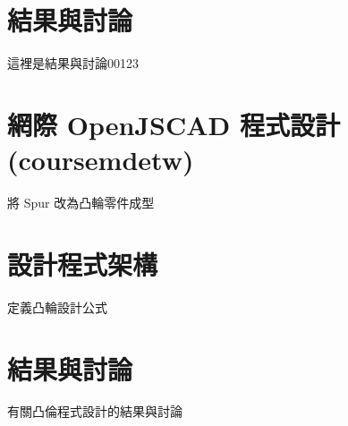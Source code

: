 \documentclass[]{article}
\begin{document}
\section{結果與討論}\label{ux7d50ux679cux8207ux8a0eux8ad6-14}

這裡是結果與討論00123

\section{網際 OpenJSCAD
程式設計(coursemdetw)}\label{ux7db2ux969b-openjscad-ux7a0bux5f0fux8a2dux8a08coursemdetw}

將 Spur 改為凸輪零件成型

\section{設計程式架構}\label{ux8a2dux8a08ux7a0bux5f0fux67b6ux69cb}

定義凸輪設計公式

\section{結果與討論}\label{ux7d50ux679cux8207ux8a0eux8ad6-15}

有關凸倫程式設計的結果與討論
\end{document}
